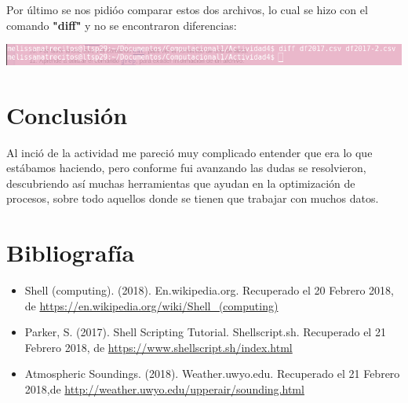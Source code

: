\documentclass{article}
\begin{document}
Por último se nos pidióo comparar estos dos archivos, lo cual se hizo con el comando \textbf{"diff"} y no se encontraron diferencias:
 \begin{center}
 \includegraphics[width=1\textwidth]{diff.png}

\end{center}

\section{Conclusión}
Al inció de la actividad me pareció muy complicado entender que era lo que estábamos haciendo, pero conforme fui avanzando las dudas se resolvieron, descubriendo así muchas herramientas que ayudan en la optimización de procesos, sobre todo aquellos donde se tienen que trabajar con muchos datos.
\section{Bibliografía}
\begin{itemize}
\item Shell (computing). (2018). En.wikipedia.org. Recuperado el 20 Febrero 2018, de \url{https://en.wikipedia.org/wiki/Shell_(computing)}
\item Parker, S. (2017). Shell Scripting Tutorial. Shellscript.sh. Recuperado el 21 Febrero 2018, de \url{https://www.shellscript.sh/index.html}
\item Atmospheric Soundings. (2018). Weather.uwyo.edu. Recuperado el 21 Febrero 2018,de \url{http://weather.uwyo.edu/upperair/sounding.html}
\end {itemize}
\end{document}
